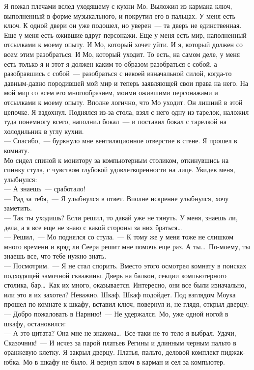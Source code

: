Я пожал плечами вслед уходящему с кухни Мо. Выложил из кармана ключ, 
выполненный в форме музыкального, и покрутил его в пальцах. У меня есть ключ. К одной двери 
он уже подошел, но уверен~--- та дверь не единственная. Еще у меня есть ожившие 
вдруг персонажи. Еще у меня есть мир, наполненный отсылками к моему опыту. И 
Мо, который хочет уйти. И я, который должен со всем этим разобраться. И Мо, который 
уходит. То есть, на самом деле, у меня есть только я и этот я должен каким-то 
образом разобраться с собой, а разобравшись с собой~--- разобраться с некоей 
изначальной силой, когда-то давным-давно породившей мой мир и теперь заявляющей 
свои права на него. На мой мир со всем его многообразием, моими ожившими 
персонажами и отсылками к моему опыту. Вполне логично, что Мо уходит. Он лишний 
в этой цепочке. Я вздохнул. Поднялся из-за стола, взял с него одну из тарелок, 
наложил туда понемногу всего, наполнил бокал~--- и поставил бокал с тарелкой на 
холодильник в углу кухни.\\
--- Спасибо,~--- буркнуло мне вентиляционное отверстие в стене. Я прошел в 
комнату. \\
Мо сидел спиной к монитору за компьютерным столиком, откинувшись на спинку 
стула, с чувством глубокой удовлетворенности на лице. Увидев меня, улыбнулся:\\
--- А знаешь~--- сработало!\\
--- Рад за тебя,~--- Я улыбнулся в ответ. Вполне искренне улыбнулся, хочу 
заметить. \\
--- Так ты уходишь? Если решил, то давай уже не тянуть. У меня, знаешь ли, дела, 
а я все еще не знаю с какой стороны за них браться\ldots\\
--- Решил,~--- Мо поднялся со стула.~--- К тому же у меня тоже не слишком много 
времени и вряд ли Сеера решит мне помочь еще раз. А ты\ldots\ По-моему, ты 
знаешь все, что тебе нужно знать.\\
--- Посмотрим.~--- Я не стал спорить. Вместо этого осмотрел комнату в поисках 
подходящей замочной скважины. Дверь на балкон, секции компьютерного столика, 
бар\ldots\ Как их много, оказывается. Интересно, они все были изначально, или 
это я их захотел? Неважно. Шкаф. Шкаф подойдет. Под взглядом Моука прошел по комнате к 
шкафу, вставил ключ, повернул и, не глядя, открыл дверцу:\\
--- Добро пожаловать в Нарнию!~--- Не удержался. Мо, уже одной ногой в шкафу, 
остановился:\\
--- А это цитата? Она мне не знакома\ldots\ Все-таки не то тело я выбрал. Удачи, 
Сказочник!~--- И исчез за парой платьев Регины и длинным черным пальто в 
оранжевую клетку. Я закрыл дверцу. Платья, пальто, деловой комплект пиджак-юбка. Мо в 
шкафу не было. Я вернул ключ в карман и сел за компьютер.


